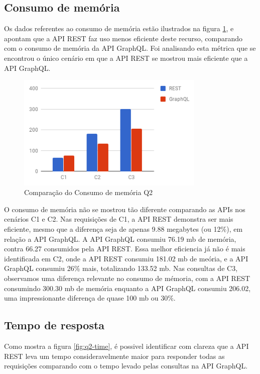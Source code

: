 \subsection{Consumo de memória}

Os dados referentes ao consumo de memória estão ilustrados na figura \ref{fig:q2-mem}, e apontam que a API REST faz uso menos eficiente deste recurso, comparando com o consumo de memória da API GraphQL. Foi analisando esta métrica que se encontrou o único cenário em que a API REST se mostrou mais eficiente que a API GraphQL.

\begin{figure}[htbp]
    \centering
    \includegraphics[width=0.8\textwidth]{figuras/q2-memory.png}
    \caption{Comparação do Consumo de memória Q2}
    \label{fig:q2-mem}
    \author{fonte: Autor}
\end{figure}

O consumo de memória não se mostrou tão diferente comparando as APIs nos cenários C1 e C2. Nas requisições de C1, a API REST demonstra ser mais eficiente, mesmo que a diferença seja de apenas 9.88 megabytes (ou 12\%), em relação a API GraphQL. A API GraphQL consumiu 76.19 mb de memória, contra 66.27 consumidos pela API REST. Essa melhor eficiencia já não é mais identificada em C2, onde a API REST consumiu 181.02 mb de meória, e a API GraphQL consumiu 26\% mais, totalizando 133.52 mb. Nas consultas de C3, observamos uma diferença relevante no consumo de mémoria, com a API REST consumindo 300.30 mb de memória enquanto a API GraphQL consumiu 206.02, uma impressionante diferença de quase 100 mb ou 30\%.

\subsection{Tempo de resposta}

Como mostra a figura \ref{fig:q2-time}, é possivel identificar com clareza que a API REST leva um tempo consideravelmente maior para responder todas as requisições comparando com o tempo levado pelas consultas na API GraphQL.

